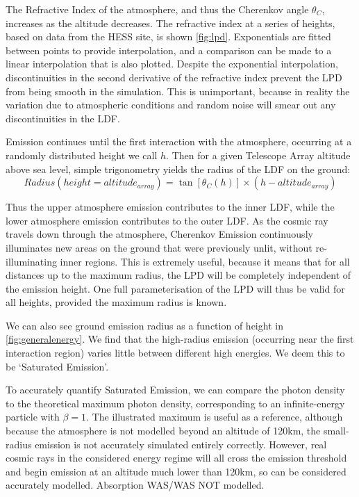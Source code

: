 \documentclass{article}
\begin{document}
The Refractive Index of the atmosphere, and thus the Cherenkov angle $\theta_{C}$, increases as the altitude decreases. The refractive index at a series of heights, based on data from the HESS site, is shown \ref{fig:lpd}. Exponentials are fitted between points to provide interpolation, and a comparison can be made to a linear interpolation that is also plotted. Despite the exponential interpolation, discontinuities in the second derivative of the refractive index prevent the LPD from being smooth in the simulation. This is unimportant, because in reality the variation due to atmospheric conditions and random noise will smear out any discontinuities in the LDF.

Emission continues until the first interaction with the atmosphere, occurring at a randomly distributed height we call $h$. Then for a given Telescope Array altitude above sea level, simple trigonometry yields the radius of the LDF on the ground:
\[ Radius(height = altitude_{array}) = \tan [\theta_{C}(h)] \times (h - altitude_{array})\]

Thus the upper atmosphere emission contributes to the inner LDF, while the lower atmosphere emission contributes to the outer LDF. As the cosmic ray travels down through the atmosphere, Cherenkov Emission continuously illuminates new areas on the ground that were previously unlit, without re-illuminating inner regions. This is extremely useful, because it means that for all distances up to the maximum radius, the LPD will be completely independent of the emission height. One full parameterisation of the LPD will thus be valid for all heights, provided the maximum radius is known.

We can also see ground emission radius as a function of height in \ref{fig:generalenergy}. We find that the high-radius emission (occurring near the first interaction region) varies little between different high energies. We deem this to be \textquoteleft Saturated Emission\textquoteright.

To accurately quantify Saturated Emission, we can compare the photon density to the theoretical maximum photon density, corresponding to an infinite-energy particle with $\beta =1$. The illustrated maximum is useful as a reference, although because the atmosphere is not modelled beyond an altitude of 120km, the small-radius emission is not accurately simulated entirely correctly. However, real cosmic rays in the considered energy regime will all cross the emission threshold and begin emission at an altitude much lower than 120km, so can be considered accurately modelled. Absorption WAS/WAS NOT modelled.
\end{document}
